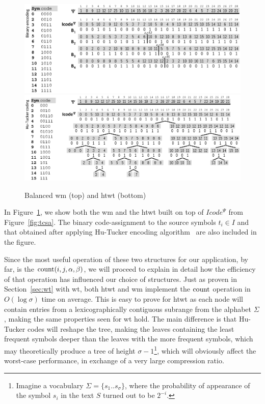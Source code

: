 	\begin{figure}[ht]
		\begin{center}
			{\includegraphics[width=1.0\textwidth]{figures/wma.eps}}
			{\includegraphics[width=1.0\textwidth]{figures/wta.eps}}
		\end{center}
		\caption{Balanced \acrlong{wm} (top) and \acrlong{htwt} (bottom)}
		\label{fig:wtwm}
	\end{figure}


	In Figure~\ref{fig:wtwm}, we show both the \gls{wm} and the \gls{htwt} built on top of $Icode^{\Psi}$ from Figure~\ref{fig:tcsa}.
	The binary code-assignment to the source symbols $t_i \in I$ and that obtained after applying Hu-Tucker encoding
	algorithm~\cite{hu1971optimal} are also included in the figure.
	
	Since the most useful operation of these two structures for our application, by far, is the $\operatorname{count}(i,j,\alpha,\beta)$, we will proceed to explain in detail how the efficiency of that operation has influenced our choice of structures. Just as proven in Section~\ref{sec:wt} with \gls{wt}, both \gls{htwt} and \gls{wm} implement the $\operatorname{count}$ operation in $O(\log\sigma)$ time on average. This is easy to prove for \gls{htwt} as each node will contain entries from a lexicographically contiguous subrange from the alphabet $\Sigma$, making the same properties seen for \gls{wt} hold. The main difference is that Hu-Tucker codes will reshape the tree, making the leaves containing the least frequent symbols deeper than the leaves with the more frequent symbols, which may theoretically produce a tree of height $\sigma-1$\footnote{Imagine a vocabulary $\Sigma=\{s_1..s_\sigma\}$, where the probability of appearance of the symbol $s_i$ in the text $S$ turned out to be $2^{-i}$.}, which will obviously affect the worst-case performance, in exchange of a very large compression ratio.

